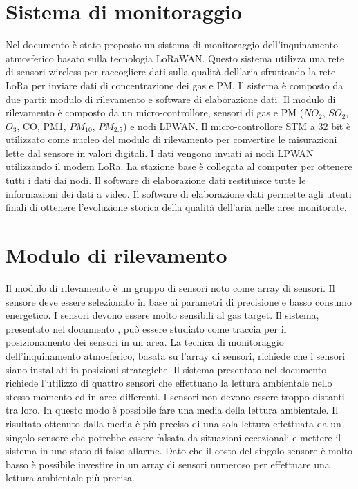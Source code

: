 \documentclass[a4paper]{report} %
\begin{document}
\section{Sistema di monitoraggio}

Nel documento \cite{art:rif.40} è stato proposto un sistema di monitoraggio dell'inquinamento atmosferico basato sulla tecnologia LoRaWAN. 
Questo sistema utilizza una rete di sensori wireless per raccogliere dati sulla qualità dell'aria sfruttando la rete LoRa per inviare dati di concentrazione dei gas e PM. 
Il sistema è composto da due parti: modulo di rilevamento e software di elaborazione dati. 
Il modulo di rilevamento è composto da un micro-controllore, sensori di gas e PM ($ NO_{2} $, $ SO_{2} $, $ O_{3} $, CO, PM1, $ PM_{10} $, $ PM_{2.5} $) e nodi LPWAN. 
Il micro-controllore STM a 32 bit è utilizzato come nucleo del modulo di rilevamento per convertire le misurazioni lette dal sensore in valori digitali. 
I dati vengono inviati ai nodi LPWAN utilizzando il modem LoRa. 
La stazione base è collegata al computer per ottenere tutti i dati dai nodi. 
Il software di elaborazione dati restituisce tutte le informazioni dei dati a video. Il software di elaborazione dati permette agli utenti finali di ottenere l'evoluzione storica della qualità dell'aria nelle aree monitorate.

\section{Modulo di rilevamento}
Il modulo di rilevamento è un gruppo di sensori noto come array di sensori. 
Il sensore deve essere selezionato in base ai parametri di precisione e basso consumo energetico. I sensori devono essere molto sensibili al gas target. 
Il sistema, presentato nel documento \cite{art:rif.40}, può essere studiato come traccia per il posizionamento dei sensori in un area.
La tecnica di monitoraggio dell'inquinamento atmosferico, basata su l'array di sensori, richiede che i sensori siano installati in posizioni strategiche.
Il sistema presentato nel documento \cite{art:rif.40} richiede l'utilizzo di quattro sensori che effettuano la lettura ambientale nello stesso momento ed in aree differenti.
I sensori non devono essere troppo distanti tra loro. In questo modo è possibile fare una media della lettura ambientale. 
Il risultato ottenuto dalla media è più preciso di una sola lettura effettuata da un singolo sensore che potrebbe essere falsata da situazioni eccezionali e mettere il sistema in uno stato di falso allarme. 
Dato che il costo del singolo sensore è molto basso è possibile investire in un array di sensori numeroso per effettuare una lettura ambientale più precisa. 
\end{document}
